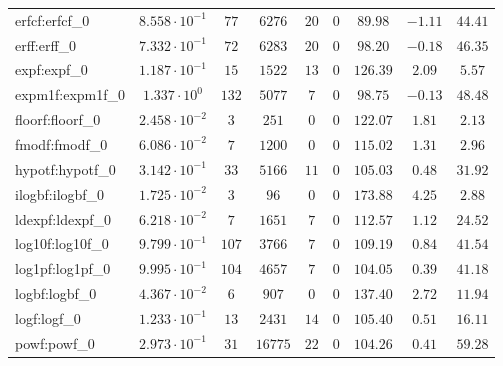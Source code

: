 \begin{tabular}{|l|c|c|c|c|c|c|c|c|}
erfcf:erfcf\_0               & $ 8.558 \cdot 10^{-1} $ & $ 77     $ & $ 6276   $ & $ 20  $ & $ 0   $ & $ 89.98       $ & $ -1.11   $ & $ 44.41   $ \\
erff:erff\_0                 & $ 7.332 \cdot 10^{-1} $ & $ 72     $ & $ 6283   $ & $ 20  $ & $ 0   $ & $ 98.20       $ & $ -0.18   $ & $ 46.35   $ \\
expf:expf\_0                 & $ 1.187 \cdot 10^{-1} $ & $ 15     $ & $ 1522   $ & $ 13  $ & $ 0   $ & $ 126.39      $ & $ 2.09    $ & $ 5.57    $ \\
expm1f:expm1f\_0             & $ 1.337 \cdot 10^{0}  $ & $ 132    $ & $ 5077   $ & $ 7   $ & $ 0   $ & $ 98.75       $ & $ -0.13   $ & $ 48.48   $ \\
floorf:floorf\_0             & $ 2.458 \cdot 10^{-2} $ & $ 3      $ & $ 251    $ & $ 0   $ & $ 0   $ & $ 122.07      $ & $ 1.81    $ & $ 2.13    $ \\
fmodf:fmodf\_0               & $ 6.086 \cdot 10^{-2} $ & $ 7      $ & $ 1200   $ & $ 0   $ & $ 0   $ & $ 115.02      $ & $ 1.31    $ & $ 2.96    $ \\
hypotf:hypotf\_0             & $ 3.142 \cdot 10^{-1} $ & $ 33     $ & $ 5166   $ & $ 11  $ & $ 0   $ & $ 105.03      $ & $ 0.48    $ & $ 31.92   $ \\
ilogbf:ilogbf\_0             & $ 1.725 \cdot 10^{-2} $ & $ 3      $ & $ 96     $ & $ 0   $ & $ 0   $ & $ 173.88      $ & $ 4.25    $ & $ 2.88    $ \\
ldexpf:ldexpf\_0             & $ 6.218 \cdot 10^{-2} $ & $ 7      $ & $ 1651   $ & $ 7   $ & $ 0   $ & $ 112.57      $ & $ 1.12    $ & $ 24.52   $ \\
log10f:log10f\_0             & $ 9.799 \cdot 10^{-1} $ & $ 107    $ & $ 3766   $ & $ 7   $ & $ 0   $ & $ 109.19      $ & $ 0.84    $ & $ 41.54   $ \\
log1pf:log1pf\_0             & $ 9.995 \cdot 10^{-1} $ & $ 104    $ & $ 4657   $ & $ 7   $ & $ 0   $ & $ 104.05      $ & $ 0.39    $ & $ 41.18   $ \\
logbf:logbf\_0               & $ 4.367 \cdot 10^{-2} $ & $ 6      $ & $ 907    $ & $ 0   $ & $ 0   $ & $ 137.40      $ & $ 2.72    $ & $ 11.94   $ \\
logf:logf\_0                 & $ 1.233 \cdot 10^{-1} $ & $ 13     $ & $ 2431   $ & $ 14  $ & $ 0   $ & $ 105.40      $ & $ 0.51    $ & $ 16.11   $ \\
powf:powf\_0                 & $ 2.973 \cdot 10^{-1} $ & $ 31     $ & $ 16775  $ & $ 22  $ & $ 0   $ & $ 104.26      $ & $ 0.41    $ & $ 59.28   $ \\

\end{tabular}
